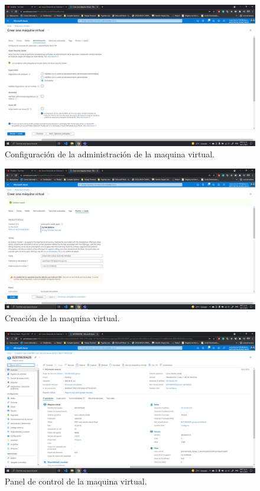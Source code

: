 \documentclass[11pt]{article}
\begin{document}
		\begin{figure}[H]
			\centering
			\includegraphics[scale=0.34]{resources/datosadministracion.png}
			\caption{Configuración de la administración de la maquina virtual.}\label{fig:picture}
		\end{figure}
		\begin{figure}[H]
			\centering
			\includegraphics[scale=0.34]{resources/revisarycrear.png}
			\caption{Creación de la maquina virtual.}\label{fig:picture}
		\end{figure}
		\begin{figure}[H]
			\centering
			\includegraphics[scale=0.34]{resources/Panelcontrol.png}
			\caption{Panel de control de la maquina virtual.}\label{fig:picture}
		\end{figure}
		
\end{document}
